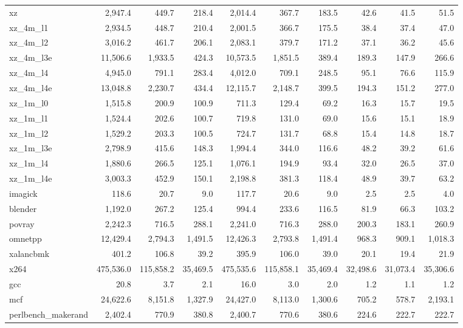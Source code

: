 \documentclass[10pt,a4paper]{article}
\begin{document}
{\begin{longtable}{@{}lrrrrrrrrr@{}}
xz & 2,947.4 & 449.7 & 218.4 & 2,014.4 & 367.7 & 183.5 & 42.6 & 41.5 & 51.5 \\
xz\_4m\_l1 & 2,934.5 & 448.7 & 210.4 & 2,001.5 & 366.7 & 175.5 & 38.4 & 37.4 & 47.0 \\
xz\_4m\_l2 & 3,016.2 & 461.7 & 206.1 & 2,083.1 & 379.7 & 171.2 & 37.1 & 36.2 & 45.6 \\
xz\_4m\_l3e & 11,506.6 & 1,933.5 & 424.3 & 10,573.5 & 1,851.5 & 389.4 & 189.3 & 147.9 & 266.6 \\
xz\_4m\_l4 & 4,945.0 & 791.1 & 283.4 & 4,012.0 & 709.1 & 248.5 & 95.1 & 76.6 & 115.9 \\
xz\_4m\_l4e & 13,048.8 & 2,230.7 & 434.4 & 12,115.7 & 2,148.7 & 399.5 & 194.3 & 151.2 & 277.0 \\
xz\_1m\_l0 & 1,515.8 & 200.9 & 100.9 & 711.3 & 129.4 & 69.2 & 16.3 & 15.7 & 19.5 \\
xz\_1m\_l1 & 1,524.4 & 202.6 & 100.7 & 719.8 & 131.0 & 69.0 & 15.6 & 15.1 & 18.9 \\
xz\_1m\_l2 & 1,529.2 & 203.3 & 100.5 & 724.7 & 131.7 & 68.8 & 15.4 & 14.8 & 18.7 \\
xz\_1m\_l3e & 2,798.9 & 415.6 & 148.3 & 1,994.4 & 344.0 & 116.6 & 48.2 & 39.2 & 61.6 \\
xz\_1m\_l4 & 1,880.6 & 266.5 & 125.1 & 1,076.1 & 194.9 & 93.4 & 32.0 & 26.5 & 37.0 \\
xz\_1m\_l4e & 3,003.3 & 452.9 & 150.1 & 2,198.8 & 381.3 & 118.4 & 48.9 & 39.7 & 63.2 \\
imagick & 118.6 & 20.7 & 9.0 & 117.7 & 20.6 & 9.0 & 2.5 & 2.5 & 4.0 \\
blender & 1,192.0 & 267.2 & 125.4 & 994.4 & 233.6 & 116.5 & 81.9 & 66.3 & 103.2 \\
povray & 2,242.3 & 716.5 & 288.1 & 2,241.0 & 716.3 & 288.0 & 200.3 & 183.1 & 260.9 \\
omnetpp & 12,429.4 & 2,794.3 & 1,491.5 & 12,426.3 & 2,793.8 & 1,491.4 & 968.3 & 909.1 & 1,018.3 \\
xalancbmk & 401.2 & 106.8 & 39.2 & 395.9 & 106.0 & 39.0 & 20.1 & 19.4 & 21.9 \\
x264 & 475,536.0 & 115,858.2 & 35,469.5 & 475,535.6 & 115,858.1 & 35,469.4 & 32,498.6 & 31,073.4 & 35,306.6 \\
gcc & 20.8 & 3.7 & 2.1 & 16.0 & 3.0 & 2.0 & 1.2 & 1.1 & 1.2 \\
mcf & 24,622.6 & 8,151.8 & 1,327.9 & 24,427.0 & 8,113.0 & 1,300.6 & 705.2 & 578.7 & 2,193.1 \\
perlbench\_makerand & 2,402.4 & 770.9 & 380.8 & 2,400.7 & 770.6 & 380.6 & 224.6 & 222.7 & 222.7 \\

\end{longtable}}
\end{document}
